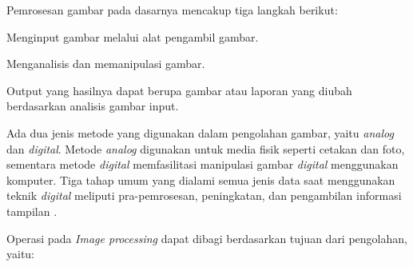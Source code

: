 Pemrosesan gambar pada dasarnya mencakup tiga langkah berikut:

\begin{packed_item}
	\item Menginput gambar melalui alat pengambil gambar.
	\item Menganalisis dan memanipulasi gambar.
	\item Output yang hasilnya dapat berupa gambar atau laporan yang diubah berdasarkan analisis gambar input.
\end{packed_item}

Ada dua jenis metode yang digunakan dalam pengolahan gambar, yaitu \textit{analog} dan \textit{digital}. Metode \textit{analog} digunakan untuk media fisik seperti cetakan dan foto, sementara metode \textit{digital} memfasilitasi manipulasi gambar \textit{digital} menggunakan komputer. Tiga tahap umum yang dialami semua jenis data saat menggunakan teknik \textit{digital} meliputi pra-pemrosesan, peningkatan, dan pengambilan informasi tampilan \citep{digitalimageproc}.

Operasi pada \textit{Image processing} dapat dibagi berdasarkan tujuan dari pengolahan, yaitu:

